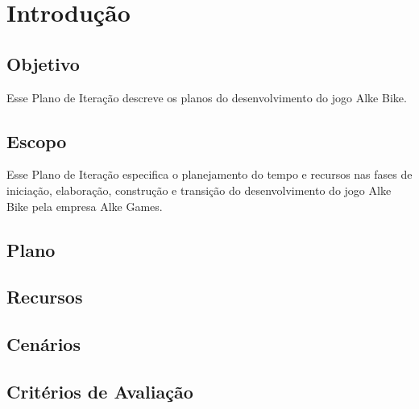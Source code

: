 \section{Introdução} 
\subsection{Objetivo}

Esse Plano de Iteração descreve os planos do desenvolvimento do jogo Alke Bike.

\subsection{Escopo}

Esse Plano de Iteração especifica o planejamento do tempo e recursos nas fases de iniciação, elaboração, construção e transição do desenvolvimento do jogo Alke Bike pela empresa Alke Games.

\subsection{Plano}

\subsection{Recursos}

\subsection{Cenários}

\subsection{Critérios de Avaliação}